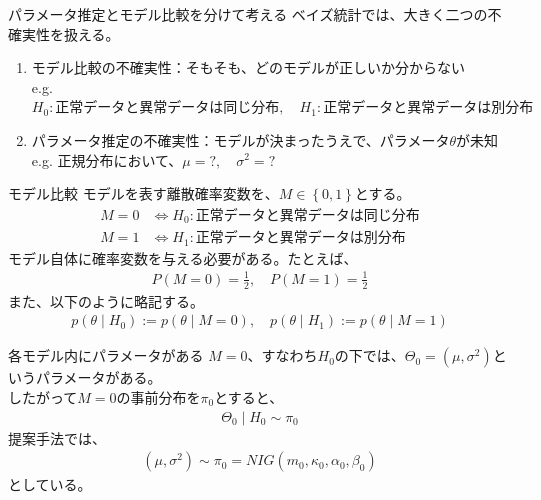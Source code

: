\documentclass[dvipdfmx, 11pt, aspectratio=169, notheorems]{beamer}
\begin{document}
\begin{frame}{パラメータ推定とモデル比較を分けて考える}
    ベイズ統計では、大きく二つの不確実性を扱える。\\
    \vspace{12pt}
    \begin{enumerate}
        \item モデル比較の不確実性：そもそも、どのモデルが正しいか分からない\\
            {\scriptsize e.g. $H_0: \text{正常データと異常データは同じ分布}, \quad H_1: \text{正常データと異常データは別分布}$}
        \item パラメータ推定の不確実性：モデルが決まったうえで、パラメータ$\theta$が未知\\
            {\scriptsize e.g. 正規分布において、$\mu=?, \quad \sigma^2=?$}
    \end{enumerate}
\end{frame}

\begin{frame}{モデル比較}
    モデルを表す離散確率変数を、$M\in\left\{0, 1\right\}$とする。
    \begin{align}
        M=0 &\Longleftrightarrow H_0: \text{正常データと異常データは同じ分布} \\
        M=1 &\Longleftrightarrow H_1: \text{正常データと異常データは別分布}
    \end{align}
    モデル自体に確率変数を与える必要がある。たとえば、
    \begin{align}
        P(M=0) = \frac{1}{2}, \quad P(M=1) = \frac{1}{2}
    \end{align}
    また、以下のように略記する。
    \begin{align}
        p(\theta \mid H_0) := p(\theta \mid M=0) , \quad  p(\theta \mid H_1) := p(\theta \mid M=1)
    \end{align}
\end{frame}

\begin{frame}{各モデル内にパラメータがある}
    $M=0$、すなわち$H_0$の下では、$\Theta_0=(\mu, \sigma^2)$というパラメータがある。\\
    したがって$M=0$の事前分布を$\pi_0$とすると、
    \begin{align}
        \Theta_0 \mid H_0 \sim \pi_0
    \end{align}
    提案手法では、
    \begin{align}
        (\mu, \sigma^2) \sim \pi_0 = NIG(m_0, \kappa_0, \alpha_0, \beta_0)   
    \end{align}
    としている。
\end{frame}
\end{document}
